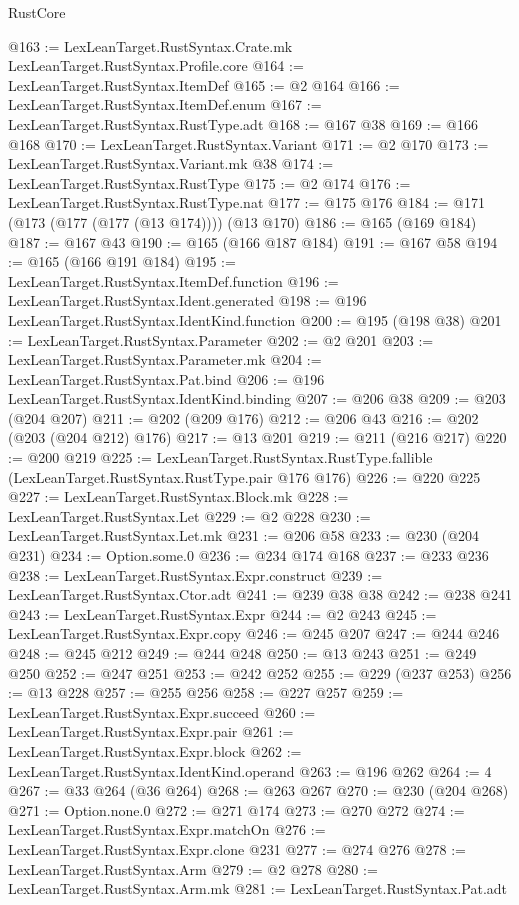 \begin{lexlean}{RustCore}
\begin{coremodule}
@163 := LexLeanTarget.RustSyntax.Crate.mk LexLeanTarget.RustSyntax.Profile.core
@164 := LexLeanTarget.RustSyntax.ItemDef
@165 := @2 @164
@166 := LexLeanTarget.RustSyntax.ItemDef.enum
@167 := LexLeanTarget.RustSyntax.RustType.adt
@168 := @167 @38
@169 := @166 @168
@170 := LexLeanTarget.RustSyntax.Variant
@171 := @2 @170
@173 := LexLeanTarget.RustSyntax.Variant.mk @38
@174 := LexLeanTarget.RustSyntax.RustType
@175 := @2 @174
@176 := LexLeanTarget.RustSyntax.RustType.nat
@177 := @175 @176
@184 := @171 (@173 (@177 (@177 (@13 @174)))) (@13 @170)
@186 := @165 (@169 @184)
@187 := @167 @43
@190 := @165 (@166 @187 @184)
@191 := @167 @58
@194 := @165 (@166 @191 @184)
@195 := LexLeanTarget.RustSyntax.ItemDef.function
@196 := LexLeanTarget.RustSyntax.Ident.generated
@198 := @196 LexLeanTarget.RustSyntax.IdentKind.function
@200 := @195 (@198 @38)
@201 := LexLeanTarget.RustSyntax.Parameter
@202 := @2 @201
@203 := LexLeanTarget.RustSyntax.Parameter.mk
@204 := LexLeanTarget.RustSyntax.Pat.bind
@206 := @196 LexLeanTarget.RustSyntax.IdentKind.binding
@207 := @206 @38
@209 := @203 (@204 @207)
@211 := @202 (@209 @176)
@212 := @206 @43
@216 := @202 (@203 (@204 @212) @176)
@217 := @13 @201
@219 := @211 (@216 @217)
@220 := @200 @219
@225 := LexLeanTarget.RustSyntax.RustType.fallible
    (LexLeanTarget.RustSyntax.RustType.pair @176 @176)
@226 := @220 @225
@227 := LexLeanTarget.RustSyntax.Block.mk
@228 := LexLeanTarget.RustSyntax.Let
@229 := @2 @228
@230 := LexLeanTarget.RustSyntax.Let.mk
@231 := @206 @58
@233 := @230 (@204 @231)
@234 := Option.some.{0}
@236 := @234 @174 @168
@237 := @233 @236
@238 := LexLeanTarget.RustSyntax.Expr.construct
@239 := LexLeanTarget.RustSyntax.Ctor.adt
@241 := @239 @38 @38
@242 := @238 @241
@243 := LexLeanTarget.RustSyntax.Expr
@244 := @2 @243
@245 := LexLeanTarget.RustSyntax.Expr.copy
@246 := @245 @207
@247 := @244 @246
@248 := @245 @212
@249 := @244 @248
@250 := @13 @243
@251 := @249 @250
@252 := @247 @251
@253 := @242 @252
@255 := @229 (@237 @253)
@256 := @13 @228
@257 := @255 @256
@258 := @227 @257
@259 := LexLeanTarget.RustSyntax.Expr.succeed
@260 := LexLeanTarget.RustSyntax.Expr.pair
@261 := LexLeanTarget.RustSyntax.Expr.block
@262 := LexLeanTarget.RustSyntax.IdentKind.operand
@263 := @196 @262
@264 := 4
@267 := @33 @264 (@36 @264)
@268 := @263 @267
@270 := @230 (@204 @268)
@271 := Option.none.{0}
@272 := @271 @174
@273 := @270 @272
@274 := LexLeanTarget.RustSyntax.Expr.matchOn
@276 := LexLeanTarget.RustSyntax.Expr.clone @231
@277 := @274 @276
@278 := LexLeanTarget.RustSyntax.Arm
@279 := @2 @278
@280 := LexLeanTarget.RustSyntax.Arm.mk
@281 := LexLeanTarget.RustSyntax.Pat.adt

\end{coremodule}
\end{lexlean}
